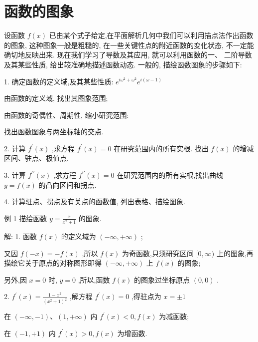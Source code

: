 \documentclass[lang=cn,newtx,10pt,scheme=chinese]{elegantbook}
\begin{document}
\section{函数的图象}

设函数 \(f\left( x\right)\) 已由某个式子给定,在平面解析几何中我们可以利用描点法作出函数的图象, 这种图象一般是粗糙的, 在一些关键性点的附近函数的变化状态, 不一定能确切地反映出来. 现在我们学习了导数及其应用, 就可以利用函数的一、 二阶导数及其某些性质, 给出较准确地描述函数动态. 一般的, 描绘函数图象的步骤如下:

1. 确定函数的定义域,及其某些性质: \({e}^{i{\omega }^{2} + {\omega }^{2}}{e}^{i\left( {\omega - 1}\right) }\)

由函数的定义域, 找出其图象范围;

由函数的奇偶性、周期性, 缩小研究范围:

找出函数图象与两坐标轴的交点.

2. 计算 \({f}^{\prime }\left( x\right)\) ,求方程 \({f}^{\prime }\left( x\right) = 0\) 在研究范围内的所有实根. 找出 \(f\left( x\right)\) 的增减区间、驻点、极值点.

3. 计算 \({f}^{\prime \prime }\left( x\right)\) ,求方程 \({f}^{\prime \prime }\left( x\right) = 0\) 在研究范围内的所有实根,找出曲线 \(y = f\left( x\right)\) 的凸向区间和拐点.

4. 计算驻点、拐点及有关点的函数值, 列出表格、描绘图象.

例 1 描绘函数 \(y = \frac{x}{{x}^{2} + 1}\) 的图象.

解: 1. 函数 \(f\left( x\right)\) 的定义域为 \(\left( {-\infty , + \infty }\right)\) ;

又因 \(f\left( {-x}\right) = - f\left( x\right)\) ,所以 \(f\left( x\right)\) 为奇函数,只须研究区间 \(\lbrack 0,\infty )\) 上的图象,再描绘它关于原点的对称图形即得 \(\left( {-\infty , + \infty }\right)\) 上 \(f\left( x\right)\) 的图象;

另外,因 \(x = 0\) 时, \(y = 0\) ,所以,函数 \(f\left( x\right)\) 的图象过坐标原点 \(\left( {0,0}\right)\) .

2. \({f}^{\prime }\left( x\right) = \frac{1 - {x}^{2}}{{\left( {x}^{2} + 1\right) }^{2}}\) ,解方程 \({f}^{\prime }\left( x\right) = 0\) ,得驻点为 \(x = \pm 1\)

在 \(\left( {-\infty , - 1}\right) \text{、}\left( {1, + \infty }\right)\) 内 \({f}^{\prime }\left( x\right) < 0,f\left( x\right)\) 为减函数;

在 \(\left( {-1, + 1}\right)\) 内 \({f}^{\prime }\left( x\right) > 0,f\left( x\right)\) 为增函数.
\end{document}
